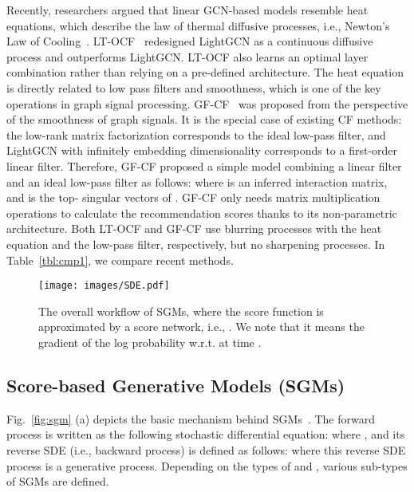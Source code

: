 \documentclass[sigconf,natbib=true]{acmart}
\begin{document}
Recently, researchers argued that linear GCN-based models resemble heat equations, which describe the law of thermal diffusive processes, i.e., Newton’s Law of Cooling~\cite{choi2021ltocf, wang2021dgc}. LT-OCF~\cite{choi2021ltocf} redesigned LightGCN as a continuous diffusive process and outperforms LightGCN. LT-OCF also learns an optimal layer combination rather than relying on a pre-defined architecture. The heat equation is directly related to low pass filters and smoothness, which is one of the key operations in graph signal processing. GF-CF~\cite{Shen21GFCF} was proposed from the perspective of the smoothness of graph signals. It is the special case of existing CF methods: the low-rank matrix factorization corresponds to the ideal low-pass filter, and LightGCN with infinitely embedding dimensionality corresponds to a first-order linear filter. Therefore, GF-CF proposed a simple model combining a linear filter and an ideal low-pass filter as follows:
where  is an inferred interaction matrix, and  is the top- singular vectors of . GF-CF only needs matrix multiplication operations to calculate the recommendation scores thanks to its non-parametric architecture. Both LT-OCF and GF-CF use blurring processes with the heat equation and the low-pass filter, respectively, but no sharpening processes. In Table~\ref{tbl:cmp1}, we compare recent methods.

\begin{figure}
    \centering
    \texttt{[image: images/SDE.pdf]}
    \caption{The overall workflow of SGMs, where the score function is approximated by a score network, i.e., . We note that it means the gradient of the log probability w.r.t.  at time .}
    \label{fig:sde}
\end{figure}

\subsection{Score-based Generative Models (SGMs)}
Fig.~\ref{fig:sgm} (a) depicts the basic mechanism behind SGMs~\cite{song2021scorebased,song2021maximum,song2020improved}. The forward process is written as the following stochastic differential equation:
where , and its reverse SDE (i.e., backward process) is defined as follows:
where this reverse SDE process is a generative process. 
Depending on the types of  and , various sub-types of SGMs are defined.
\end{document}
